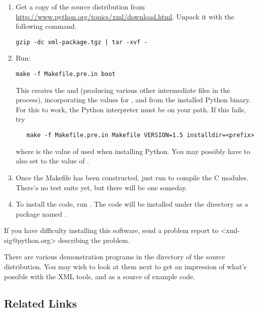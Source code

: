 \documentclass{howto}
\begin{document}
\begin{enumerate}
\item Get a copy of the source distribution from \url{http://www.python.org/topics/xml/download.html}.  Unpack it with the following command.

\begin{verbatim}
gzip -dc xml-package.tgz | tar -xvf -
\end{verbatim}

\item
 Run:
\begin{verbatim}
make -f Makefile.pre.in boot
\end{verbatim}

This creates the 
and
 (producing various other intermediate files in the process), incorporating the values for , 
and  from the installed Python binary.  For this to work,
the Python interpreter must be on your path.  If this fails, try

\begin{verbatim}
   make -f Makefile.pre.in Makefile VERSION=1.5 installdir=<prefix>
\end{verbatim}

where  is the value of  used when
installing Python.  You may possibly have to also set
 to the value of .

\item
 Once the Makefile has been constructed, just run  to
 compile the C modules.  There's no test suite yet, but there will be
 one someday.

\item
To install the code, run .
 The code will be installed under the  directory
 as a package named .  

\end{enumerate}

If you have difficulty installing this software, send a problem report
to <xml-sig@python.org> describing the problem.

There are various demonstration programs in the  directory
of the source distribution.  You may wish to look at them next to get
an impression of what's possible with the XML tools, and as a source
of example code.


\subsection{Related Links}
\end{document}
